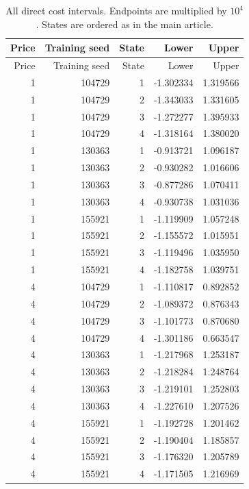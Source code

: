 \begin{center}\small
\begin{longtable}{rrrrr}
\caption{All direct cost intervals. Endpoints are multiplied by $10^4$. States are ordered as in the main article.}\label{tab:pairedfull}\\
\toprule Price & Training seed & State & Lower & Upper\\\midrule\endfirsthead
\toprule Price & Training seed & State & Lower & Upper\\\midrule\endhead
1 & 104729 & 1 & -1.302334 & 1.319566\\
1 & 104729 & 2 & -1.343033 & 1.331605\\
1 & 104729 & 3 & -1.272277 & 1.395933\\
1 & 104729 & 4 & -1.318164 & 1.380020\\
1 & 130363 & 1 & -0.913721 & 1.096187\\
1 & 130363 & 2 & -0.930282 & 1.016606\\
1 & 130363 & 3 & -0.877286 & 1.070411\\
1 & 130363 & 4 & -0.930738 & 1.031036\\
1 & 155921 & 1 & -1.119909 & 1.057248\\
1 & 155921 & 2 & -1.155572 & 1.015951\\
1 & 155921 & 3 & -1.119496 & 1.035950\\
1 & 155921 & 4 & -1.182758 & 1.039751\\
4 & 104729 & 1 & -1.110817 & 0.892852\\
4 & 104729 & 2 & -1.089372 & 0.876343\\
4 & 104729 & 3 & -1.101773 & 0.870680\\
4 & 104729 & 4 & -1.301186 & 0.663547\\
4 & 130363 & 1 & -1.217968 & 1.253187\\
4 & 130363 & 2 & -1.218284 & 1.248764\\
4 & 130363 & 3 & -1.219101 & 1.252803\\
4 & 130363 & 4 & -1.227610 & 1.207526\\
4 & 155921 & 1 & -1.192728 & 1.201462\\
4 & 155921 & 2 & -1.190404 & 1.185857\\
4 & 155921 & 3 & -1.176320 & 1.205789\\
4 & 155921 & 4 & -1.171505 & 1.216969\\
\bottomrule\end{longtable}\end{center}
